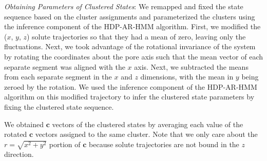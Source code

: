 \documentclass[journal=jpcbfk,manuscript=article]{achemso}
\begin{document}

  
  \textit{Obtaining Parameters of Clustered States}: We remapped and fixed the
  state sequence based on the cluster assignments and 
  parameterized the clusters using the inference component of the HDP-AR-HMM algorithm.
  First, we modified the ($x$, $y$, $z$) solute trajectories so that they had a 
  mean of zero, leaving only the fluctuations. Next, we took advantage of the
  rotational invariance of the system by rotating the coordinates about the pore 
  axis such that the mean vector of each separate segment was aligned with the 
  $x$ axis. Next, we subtracted the means from each separate segment in the $x$ 
  and $z$ dimensions, with the mean in $y$ being zeroed by the rotation. We used
  the inference component of the HDP-AR-HMM algorithm on this modified trajectory to 
  infer the clustered state parameters by fixing the clustered state sequence.
  
  We obtained $\mathbf{c}$ vectors of the clustered states by averaging each 
  value of the rotated $\mathbf{c}$ vectors assigned to the same cluster. Note
  that we only care about the $r=\sqrt{x^2+y^2}$ portion of $\mathbf{c}$ because
  solute trajectories are not bound in the $z$ direction.
  
\end{document}
